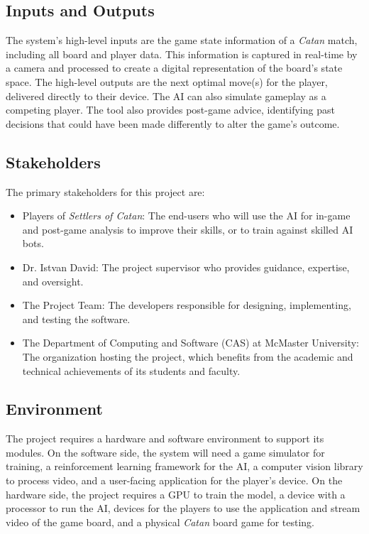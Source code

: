 \documentclass{article}
\begin{document}
\subsection{Inputs and Outputs}\label{subsec:inputs-and-outputs}
The system's high-level inputs are the game state information of a \emph{Catan} match, including all board and player data.
This information is captured in real-time by a camera and processed to create a digital representation of the board's state space.
The high-level outputs are the next optimal move(s) for the player, delivered directly to their device.
The AI can also simulate gameplay as a competing player.
The tool also provides post-game advice, identifying past decisions that could have been made differently to alter the game's outcome.

\subsection{Stakeholders}\label{subsec:stakeholders}
The primary stakeholders for this project are:
\begin{itemize}
    \item Players of \emph{Settlers of Catan}: The end-users who will use the AI for in-game and post-game analysis to improve their skills, or to train against skilled AI bots.
    \item Dr. Istvan David: The project supervisor who provides guidance, expertise, and oversight.
    \item The Project Team: The developers responsible for designing, implementing, and testing the software.
    \item The Department of Computing and Software (CAS) at McMaster University: The organization hosting the project, which benefits from the academic and technical achievements of its students and faculty.
\end{itemize}

\subsection{Environment}\label{subsec:environment}
The project requires a hardware and software environment to support its modules.
On the software side, the system will need a game simulator for training, a reinforcement learning framework for the AI, a computer vision library to process video, and a user-facing application for the player's device.
On the hardware side, the project requires a GPU to train the model, a device with a processor to run the AI, devices for the players to use the application and stream video of the game board, and a physical \emph{Catan} board game for testing.
\end{document}
